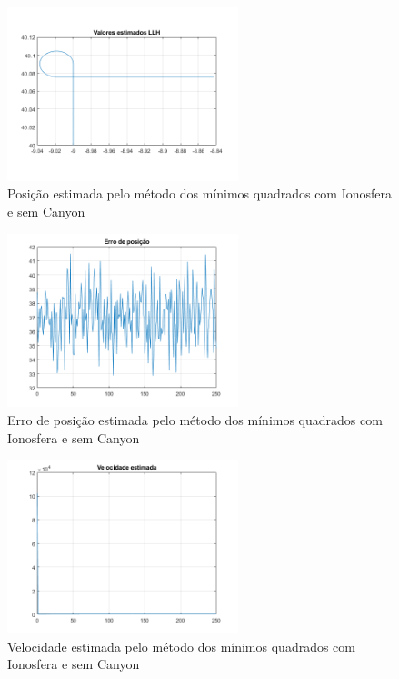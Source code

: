 \documentclass[palatino]{ist-report}
\begin{document}
\begin{figure}[ht]
	\centering
	\includegraphics[width=0.6\textwidth]{graphics/plot_posicao_estimada_LLH13.png}
	\caption{Posição estimada pelo método dos mínimos quadrados com Ionosfera e sem Canyon}
	\label{posicao13}
\end{figure}


\begin{figure}[ht]
	\centering
	\includegraphics[width=0.6\textwidth]{graphics/erro_posicao13.png}
	\caption{Erro de posição estimada pelo método dos mínimos quadrados com Ionosfera e sem Canyon}
	\label{eposicao13}
\end{figure}


\begin{figure}[ht]
	\centering
	\includegraphics[width=0.6\textwidth]{graphics/velocidade_estimada13.png}
	\caption{Velocidade estimada pelo método dos mínimos quadrados com Ionosfera e sem Canyon}
	\label{Velocidade13}
\end{figure}
\end{document}
